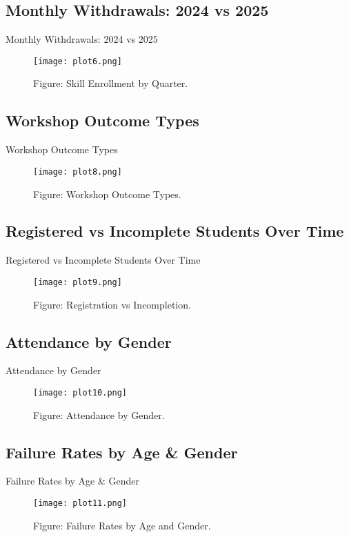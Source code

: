 \documentclass[11pt]{beamer}
\begin{document}
\subsection{Monthly Withdrawals: 2024 vs 2025}
\begin{frame}{Monthly Withdrawals: 2024 vs 2025}
    \begin{figure}
    \centering
    \texttt{[image: plot6.png]}
    \caption{Figure: Skill Enrollment by Quarter.}
    \end{figure}
\end{frame}

\subsection{Workshop Outcome Types}
\begin{frame}{Workshop Outcome Types}
    \begin{figure}
    \centering
    \texttt{[image: plot8.png]}
    \caption{Figure: Workshop Outcome Types.}
    \end{figure}
\end{frame}


\subsection{Registered vs Incomplete Students Over Time}
\begin{frame}{Registered vs Incomplete Students Over Time}
    \begin{figure}
    \centering
    \texttt{[image: plot9.png]}
    \caption{Figure: Registration vs Incompletion.}
    \end{figure}
\end{frame}

\subsection{Attendance by Gender}
\begin{frame}{Attendance by Gender}
    \begin{figure}
    \centering
    \texttt{[image: plot10.png]}
    \caption{Figure: Attendance by Gender.}
    \end{figure}
\end{frame}

\subsection{Failure Rates by Age \& Gender}
\begin{frame}{Failure Rates by Age \& Gender}
    \begin{figure}
    \centering
    \texttt{[image: plot11.png]}
    \caption{Figure: Failure Rates by Age and Gender.}
    \end{figure}
\end{frame}
\end{document}
